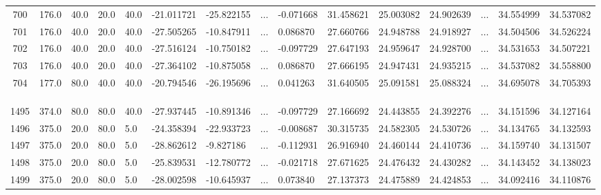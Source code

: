 \begin{table}
{\begin{tabular}{ccp{0.8cm}p{0.8cm}p{0.8cm}p{1.8cm}p{1.8cm}p{0.3cm}p{1.6cm}p{1.6cm}p{1.6cm}p{1.6cm}p{0.3cm}p{1.6cm}p{1.6cm}}
		700 &     176.0 &  40.0 &  20.0 &  40.0 &      -21.011721 &      -25.822155 &$\dots$&            -0.071668 &     31.458621 &     25.003082 &     24.902639 & $\dots$&         34.554999 &         34.537082 \\
		701 &     176.0 &  40.0 &  20.0 &  40.0 &      -27.505265 &      -10.847911 &$\dots$&             0.086870 &     27.660766 &     24.948788 &     24.918927 & $\dots$&         34.504506 &         34.526224 \\
		702 &     176.0 &  40.0 &  20.0 &  40.0 &      -27.516124 &      -10.750182 &$\dots$&            -0.097729 &     27.647193 &     24.959647 &     24.928700 & $\dots$&         34.531653 &         34.507221 \\
		703 &     176.0 &  40.0 &  20.0 &  40.0 &      -27.364102 &      -10.875058 &$\dots$&             0.086870 &     27.666195 &     24.947431 &     24.935215 & $\dots$&         34.537082 &         34.558800 \\
		704 &     177.0 &  80.0 &  40.0 &  40.0 &      -20.794546 &      -26.195696 &$\dots$&             0.041263 &     31.640505 &     25.091581 &     25.088324 &$\dots$&          34.695078 &         34.705393 \\
		
		\bottomrule
		&&&&&&&&&&&&&&\\
		&&&&&&&\sbox0{\dots}\makebox[\wd0]{\vdots}&&&&&&&\\
		&&&&&&&&&&&&&&\\
		\toprule
		
		1495 &     374.0 &  80.0 &  80.0 &  40.0 &      -27.937445 &      -10.891346 &$\dots$&            -0.097729 &     27.166692 &     24.443855 &     24.392276 &$\dots$&          34.151596 &         34.127164 \\
		1496 &     375.0 &  20.0 &  80.0 &   5.0 &      -24.358394 &      -22.933723 &$\dots$&            -0.008687 &     30.315735 &     24.582305 &     24.530726 &$\dots$&          34.134765 &         34.132593 \\
		1497 &     375.0 &  20.0 &  80.0 &   5.0 &      -28.862612 &       -9.827186 &$\dots$&            -0.112931 &     26.916940 &     24.460144 &     24.410736 &$\dots$&          34.159740 &         34.131507 \\
		1498 &     375.0 &  20.0 &  80.0 &   5.0 &      -25.839531 &      -12.780772 &$\dots$&            -0.021718 &     27.671625 &     24.476432 &     24.430282 & $\dots$&         34.143452 &         34.138023 \\
		1499 &     375.0 &  20.0 &  80.0 &   5.0 &      -28.002598 &      -10.645937 &$\dots$&             0.073840 &     27.137373 &     24.475889 &     24.424853 &$\dots$&          34.092416 &         34.110876 \\
		\bottomrule[0.5mm]
	\end{tabular}}
\end{table}

